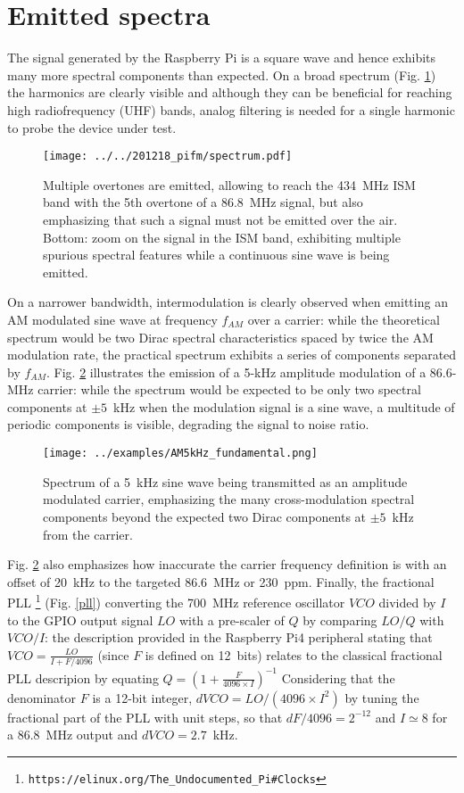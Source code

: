 \documentclass{article}
\begin{document}
\section{Emitted spectra}

The signal generated by the Raspberry Pi is a square wave and hence exhibits many
more spectral components than expected. On a broad spectrum (Fig. \ref{o1}) the
harmonics are clearly visible and although they can be beneficial for reaching
high radiofrequency (UHF) bands, analog filtering is needed for a single harmonic
to probe the device under test.

\begin{figure}[h!tb]
\texttt{[image: ../../201218\_pifm/spectrum.pdf]}
\caption{Multiple overtones are emitted, allowing to reach the 434~MHz ISM band with the
5th overtone of a 86.8~MHz signal, but also emphasizing that such a signal must
not be emitted over the air. Bottom: zoom on the signal in the ISM band, exhibiting
multiple spurious spectral features while a continuous sine wave is being emitted.}
\label{o1}
\end{figure}

On a narrower bandwidth, intermodulation is clearly observed when emitting an AM modulated 
sine wave at frequency $f_{AM}$ over a carrier: while the theoretical spectrum would be two 
Dirac spectral characteristics spaced by twice the AM modulation rate, the practical spectrum 
exhibits a series of components separated by $f_{AM}$. Fig. \ref{o2} illustrates
the emission of a 5-kHz amplitude modulation of a 86.6-MHz carrier: while the spectrum would be 
expected to be only two spectral components at $\pm 5$~kHz when the modulation signal is a sine 
wave, a multitude of periodic components is visible, degrading the signal to noise ratio.

\begin{figure}[h!tb]
\texttt{[image: ../examples/AM5kHz\_fundamental.png]}
\caption{Spectrum of a 5~kHz sine wave being transmitted as an amplitude modulated
carrier, emphasizing the many cross-modulation spectral components beyond the expected
two Dirac components at $\pm 5$~kHz from the carrier.}
\label{o2}
\end{figure}

Fig. \ref{o2} also emphasizes how inaccurate the carrier frequency definition is with an offset
of 20~kHz to the targeted 86.6~MHz or 230~ppm. Finally, the fractional PLL 
\footnote{{\tt https://elinux.org/The\_Undocumented\_Pi\#Clocks}} (Fig. \ref{pll})
converting the 700~MHz reference oscillator $VCO$ divided by $I$ to the GPIO output 
signal $LO$ with a pre-scaler of $Q$ by comparing $LO/Q$ with $VCO/I$: the description
provided in the Raspberry Pi4 peripheral stating that $VCO=\frac{LO}{I+F/4096}$ (since
$F$ is defined on 12~bits) relates to the classical fractional PLL descripion by
equating $Q=\left(1+\frac{F}{4096\times I}\right)^{-1}$
Considering that the denominator $F$ is a 12-bit integer, $dVCO=LO/(4096\times I^2)$ by 
tuning the fractional part of the PLL with unit steps, so that
$dF/4096=2^{-12}$ and $I\simeq 8$ for a $86.8$~MHz output and $dVCO=2.7$~kHz.
\end{document}

